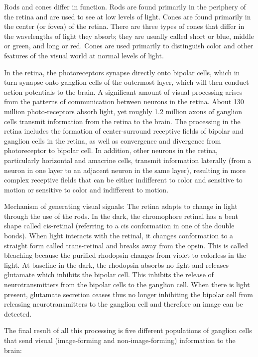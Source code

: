 \documentclass[]{book}
\begin{document}
Rods and cones differ in function. Rods are found primarily in the periphery of the retina and are used to see at low levels of light. Cones are found primarily in the center (or fovea) of the retina. There are three types of cones that differ in the wavelengths of light they absorb; they are usually called short or blue, middle or green, and long or red. Cones are used primarily to distinguish color and other features of the visual world at normal levels of light.

In the retina, the photoreceptors synapse directly onto bipolar cells, which in turn synapse onto ganglion cells of the outermost layer, which will then conduct action potentials to the brain. A significant amount of visual processing arises from the patterns of communication between neurons in the retina. About 130 million photo-receptors absorb light, yet roughly 1.2 million axons of ganglion cells transmit information from the retina to the brain. The processing in the retina includes the formation of center-surround receptive fields of bipolar and ganglion cells in the retina, as well as convergence and divergence from photoreceptor to bipolar cell. In addition, other neurons in the retina, particularly horizontal and amacrine cells, transmit information laterally (from a neuron in one layer to an adjacent neuron in the same layer), resulting in more complex receptive fields that can be either indifferent to color and sensitive to motion or sensitive to color and indifferent to motion.

Mechanism of generating visual signals: The retina adapts to change in light through the use of the rods. In the dark, the chromophore retinal has a bent shape called cis-retinal (referring to a cis conformation in one of the double bonds). When light interacts with the retinal, it changes conformation to a straight form called trans-retinal and breaks away from the opsin. This is called bleaching because the purified rhodopsin changes from violet to colorless in the light. At baseline in the dark, the rhodopsin absorbs no light and releases glutamate which inhibits the bipolar cell. This inhibits the release of neurotransmitters from the bipolar cells to the ganglion cell. When there is light present, glutamate secretion ceases thus no longer inhibiting the bipolar cell from releasing neurotransmitters to the ganglion cell and therefore an image can be detected.

The final result of all this processing is five different populations of ganglion cells that send visual (image-forming and non-image-forming) information to the brain:
\end{document}
